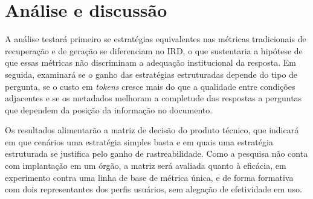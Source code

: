 
\section{Análise e discussão}

A análise testará primeiro se estratégias equivalentes nas métricas tradicionais
de recuperação e de geração se diferenciam no IRD, o que sustentaria a hipótese
de que essas métricas não discriminam a adequação institucional da resposta. Em
seguida, examinará se o ganho das estratégias estruturadas depende do tipo de
pergunta, se o custo em \textit{tokens} cresce mais do que a qualidade entre
condições adjacentes e se os metadados melhoram a completude das respostas a
perguntas que dependem da posição da informação no documento.

Os resultados alimentarão a matriz de decisão do produto técnico, que indicará
em que cenários uma estratégia simples basta e em quais uma estratégia
estruturada se justifica pelo ganho de rastreabilidade. Como a pesquisa não
conta com implantação em um órgão, a matriz será avaliada quanto à eficácia, em
experimento contra uma linha de base de métrica única, e de forma formativa com
dois representantes dos perfis usuários, sem alegação de efetividade em uso.
